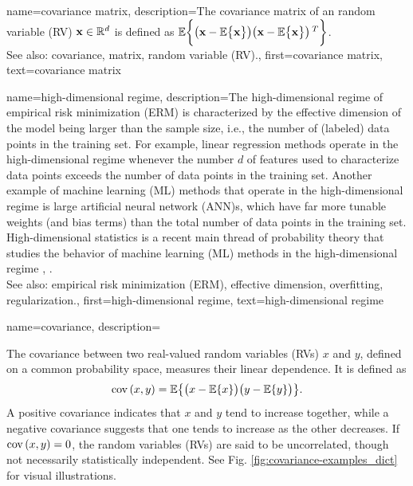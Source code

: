 {
{name={covariance matrix}, 
	description={The covariance matrix of an random variable (RV) ${\bf x} \in \mathbb{R}^{d}$ 
		is defined as $\mathbb{E}  \bigg \{ \big( {\bf x} - \mathbb{E}  \big\{ {\bf x} \big\} \big)  \big({\bf x} - \mathbb{E}  \big\{ {\bf x} \big\} \big)\,^{T} \bigg\}$.
				\\
		See also: covariance, matrix, random variable (RV).},
	first={covariance matrix},
	text={covariance matrix} 
}
	
{name={high-dimensional regime}, 
	description={The 
		high-dimensional regime of empirical risk minimization (ERM) is characterized by the effective dimension of the model 
		being larger than the sample size, i.e., the number of (labeled) data points in the training set. 
		For example, linear regression methods operate in the high-dimensional regime whenever the number $d$ of features 
		used to characterize data points exceeds the number of data points in the training set. 
		Another example of machine learning (ML) methods that operate in the high-dimensional regime is large artificial neural network (ANN)s, which have 
		far more tunable weights (and bias terms) than the total number of data points in the training set. 
		High-dimensional statistics is a recent main thread of probability theory that studies the 
		behavior of machine learning (ML) methods in the high-dimensional regime \cite{Wain2019}, \cite{BuhlGeerBook}.
				\\
		See also: empirical risk minimization (ERM), effective dimension, overfitting, regularization.},
   	first={high-dimensional regime},
	text={high-dimensional regime} 
}

{name={covariance}, 
	description={The covariance between two real-valued 
 		random variables (RVs) $x$ and $y$, defined on a common probability space, measures their linear 
 		dependence. It is defined as 
			$$
			{\rm cov}\left(x,y\right) = \mathbb{E} \big\{ \big(x - \mathbb{E} \{ x\} \big)\big(y - \mathbb{E} \{y\} \big)\big\}.
			$$
		A positive covariance indicates that $x$ and $y$ tend to increase together, 
		while a negative covariance suggests that one tends to increase as the other decreases. 
		If ${\rm cov}\left(x,y\right) = 0$, the random variables (RVs) are said to be uncorrelated, though not necessarily statistically 
		independent. See Fig. \ref{fig:covariance-examples_dict} for visual illustrations.
		\begin{figure}[H]
		\begin{tikzpicture}
		

\end{tikzpicture}
\end{figure}}}}
